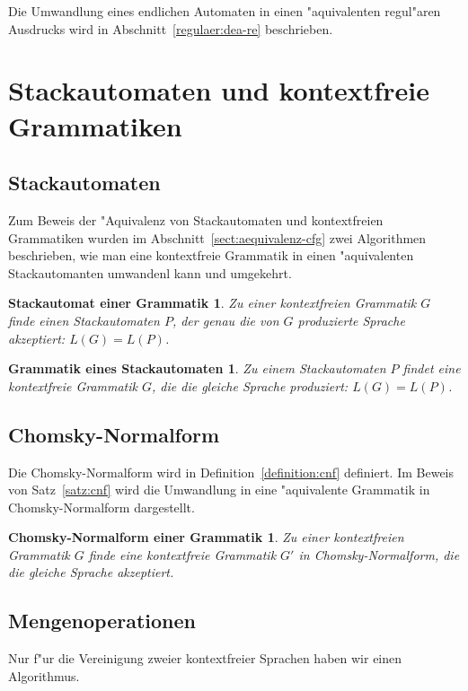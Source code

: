 Die Umwandlung eines endlichen Automaten in einen "aquivalenten
regul"aren Ausdrucks 
wird in Abschnitt~\ref{regulaer:dea-re} beschrieben.

\section{Stackautomaten und kontextfreie Grammatiken}

\subsection{Stackautomaten}
Zum Beweis der "Aquivalenz von Stackautomaten und kontextfreien Grammatiken
wurden im Abschnitt~\ref{sect:aequivalenz-cfg} zwei Algorithmen beschrieben,
wie man eine kontextfreie Grammatik in einen "aquivalenten Stackautomanten
umwandenl kann und umgekehrt.

\newtheorem*{CfgPDA}{Stackautomat einer Grammatik}
\begin{CfgPDA}
Zu einer kontextfreien Grammatik $G$ finde einen Stackautomaten $P$, 
der genau die von $G$ produzierte Sprache akzeptiert: $L(G)=L(P)$.
\end{CfgPDA}

\newtheorem*{PdaCfg}{Grammatik eines Stackautomaten}
\begin{PdaCfg}
Zu einem Stackautomaten $P$ findet eine kontextfreie Grammatik $G$, die
die gleiche Sprache produziert: $L(G)=L(P)$.
\end{PdaCfg}

\subsection{Chomsky-Normalform}
Die Chomsky-Normalform wird in Definition~\ref{definition:cnf} definiert.
Im Beweis von Satz~\ref{satz:cnf} wird die Umwandlung in eine "aquivalente
Grammatik in Chomsky-Normalform dargestellt.

\newtheorem*{CNF}{Chomsky-Normalform einer Grammatik}
\begin{CNF}
Zu einer kontextfreien Grammatik $G$ finde eine kontextfreie Grammatik $G'$
in Chomsky-Normalform, die die gleiche Sprache akzeptiert.
\end{CNF}

\subsection{Mengenoperationen}
Nur f"ur die Vereinigung zweier kontextfreier Sprachen haben wir einen
Algorithmus.

